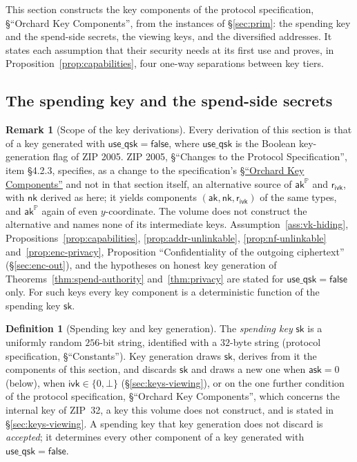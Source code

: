 \documentclass[11pt,a4paper]{article}
\theoremstyle{definition}
\newtheorem{definition}[theorem]{Definition}
\newtheorem{remark}[theorem]{Remark}
\newcommand{\PP}{\mathbb{P}}
\newcommand{\ask}{\ensuremath{\mathsf{ask}}}
\newcommand{\aksym}{\ensuremath{\mathsf{ak}}}
\newcommand{\nksym}{\ensuremath{\mathsf{nk}}}
\newcommand{\ivk}{\ensuremath{\mathsf{ivk}}}
\newcommand{\rivk}{\ensuremath{\mathsf{r_{ivk}}}}
\begin{document}
This section constructs the key components of the protocol specification,
\S``Orchard Key Components'', from the instances of \S\ref{sec:prim}: the
spending key and the spend-side secrets, the viewing keys, and the
diversified addresses. It states each assumption that their security needs
at its first use and proves, in Proposition~\ref{prop:capabilities}, four
one-way separations between key tiers.

\subsection{The spending key and the spend-side secrets}\label{sec:keys-sk}

\begin{remark}[Scope of the key derivations]
Every derivation of this section is that of a key generated with
$\mathsf{use\_qsk} = \mathsf{false}$, where $\mathsf{use\_qsk}$ is the Boolean
key-generation flag of ZIP 2005. ZIP 2005, \S``Changes to the Protocol
Specification'', item \S 4.2.3, specifies, as a change to the specification's
\href{https://zips.z.cash/protocol/protocol.pdf#orchardkeycomponents}%
{\S``Orchard Key Components''} and not in that section itself, an alternative
source of $\aksym^{\PP}$ and $\rivk$, with $\nksym$ derived as here; it
yields components $(\aksym, \nksym, \rivk)$ of the same types, and
$\aksym^{\PP}$ again of even $y$-coordinate. The volume does not construct
the alternative and names none of its intermediate keys.
Assumption~\ref{ass:vk-hiding},
Propositions~\ref{prop:capabilities}, \ref{prop:addr-unlinkable},
\ref{prop:nf-unlinkable} and~\ref{prop:enc-privacy}, Proposition
``Confidentiality of the outgoing ciphertext'' (\S\ref{sec:enc-out}), and the
hypotheses on honest key generation of Theorems~\ref{thm:spend-authority}
and~\ref{thm:privacy} are stated for $\mathsf{use\_qsk} = \mathsf{false}$
only. For such keys every key component is a deterministic function of the
spending key $\mathsf{sk}$.
\end{remark}

\begin{definition}[Spending key and key generation]
The \emph{spending key} $\mathsf{sk}$ is a uniformly random $256$-bit string,
identified with a $32$-byte string (protocol specification,
\S``Constants''). Key generation draws $\mathsf{sk}$, derives from it the
components of this section, and discards $\mathsf{sk}$ and draws a new one
when $\ask = 0$ (below), when $\ivk \in \{0, \bot\}$
(\S\ref{sec:keys-viewing}), or on the one further condition of the protocol
specification, \S``Orchard Key Components'', which concerns the internal key
of ZIP~32, a key this volume does not construct, and is stated in
\S\ref{sec:keys-viewing}. A spending key that key generation does not
discard is \emph{accepted}; it determines every other component of a key
generated with $\mathsf{use\_qsk} = \mathsf{false}$.
\end{definition}
\end{document}
